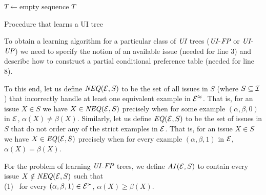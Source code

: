 \begin{algorithm}[ht]

	$T \leftarrow \mbox{empty sequence}$\;
        \Return $T$\;
\caption{Procedure  that learns a UI tree 
\label{alg:learnUI}}
\end{algorithm}

To obtain a learning algorithm for a particular class of $\textit{UI}$ trees
($\textit{UI}$-$\textit{FP}$ or $\textit{UI}$-$\textit{UP}$) we need to specify the notion 
of an available issue (needed for line 3) and describe how to construct 
a partial conditional preference table (needed for line 8). 

To this end, let us define $\mathit{NEQ}(\mathcal{E},S)$ to be the set of all issues in
$S$ (where $S\subseteq \mathcal{I}$) that incorrectly handle at least one equivalent example 
in $\mathcal{E}^\approx$. That is, for an issue $X\in S$ we have $X\in \mathit{NEQ}(\mathcal{E},S)$
precisely when for some example $(\alpha,\beta,0)$ in $\mathcal{E}$, $\alpha(X)\not=
\beta(X)$. Similarly, let us define $\mathit{EQ}(\mathcal{E},S)$ to be the set of 
issues in $S$ that do not order any of the strict examples in $\mathcal{E}$. That 
is, for an issue $X\in S$ we have $X\in \mathit{EQ}(\mathcal{E},S)$ precisely when 
for every example $(\alpha,\beta,1)$ in $\mathcal{E}$, $\alpha(X)= \beta(X)$.  

For the problem of learning $\textit{UI}$-$\textit{FP}$ trees, we define $\mathit{AI}(\mathcal{E},S)$ to
contain every issue $X\notin \mathit{NEQ}(\mathcal{E},S)$ such that\\ 
(1) \ for every $(\alpha,\beta,1) \in \mathcal{E}^\succ$, $\alpha(X) \geq \beta(X)$.

